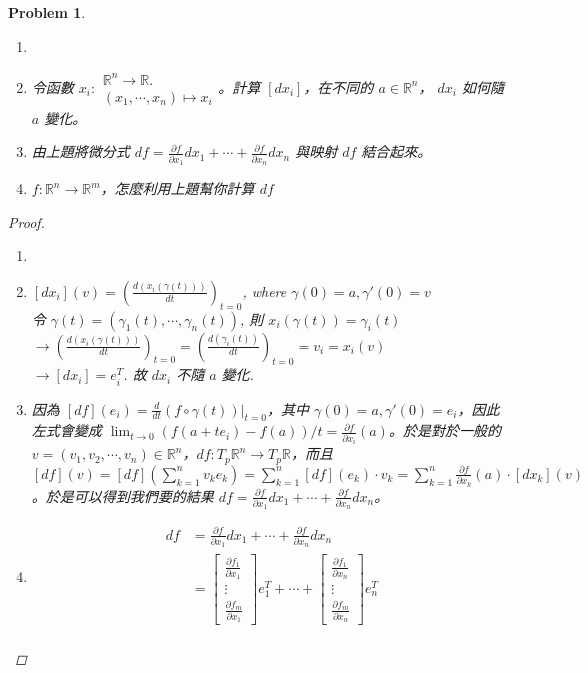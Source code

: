 \documentclass[10pt,a4paper]{article}
\newcounter{theProblemCounter}
\newtheorem{problem}[theProblemCounter]{Problem}
\begin{document}
\setcounter{theProblemCounter}{7}
\begin{problem}
\begin{enumerate}
\item[]
\item[(a)] 令函數 $x_i:\begin{array}{c}\mathbb{R}^n\to \mathbb{R}.\\ (x_1,\cdots, x_n)\mapsto x_i\end{array}$。計算 $[dx_i]$，在不同的 $a\in \mathbb{R}^n$， $dx_i$ 如何隨 $a$ 變化。
\item[(b)] 由上題將微分式 $df=\frac{\partial f}{\partial x_1} dx_1 + \cdots + \frac{\partial f}{\partial x_n} dx_n$ 與映射 $df$ 結合起來。
\item[(c)] $f:\mathbb{R}^n\to \mathbb{R}^m$，怎麼利用上題幫你計算 $df$
\end{enumerate}
\begin{proof}
\begin{enumerate}
\item[]
\item[(a)]
$[dx_i](v)=\left(\frac{d(x_i(\gamma(t)))}{dt}\right)_{t=0}$, where $\gamma(0)=a, \gamma'(0)=v$\\
令 $\gamma(t)=\left(\gamma_1(t),\cdots,\gamma_n(t)\right)$, 則 $x_i(\gamma(t))=\gamma_i(t)$\\
$\rightarrow \left(\frac{d(x_i(\gamma(t)))}{dt}\right)_{t=0}=\left(\frac{d(\gamma_i(t))}{dt}\right)_{t=0}=v_i=x_i(v)$\\
$\rightarrow [dx_i]=e_i^T$.
故 $dx_i$ 不隨 $a$ 變化.
\item[(b)]
因為 $[df](e_i) =\frac{d}{dt}(f\circ \gamma(t))\bigg|_{t=0}$，其中 $\gamma(0)=a, \gamma'(0)=e_i$，因此左式會變成 $\lim_{t\to 0} (f(a+te_i)-f(a))/t = \frac{\partial f}{\partial x_i}(a)$。於是對於一般的 $v=(v_1,v_2,\cdots, v_n)\in \mathbb{R}^n$，$df:T_p\mathbb{R}^n\to T_p\mathbb{R}$，而且 $[df](v) = [df](\sum_{k=1}^n v_ke_k) = \sum_{k=1}^n [df](e_k)\cdot v_k = \sum_{k=1}^n \frac{\partial f}{\partial x_k}(a)\cdot [dx_k](v)$。於是可以得到我們要的結果 $df=\frac{\partial f}{\partial x_1} dx_1 + \cdots + \frac{\partial f}{\partial x_n} dx_n$。
\item[(c)]
\begin{align*}
df&=\frac{\partial f}{\partial x_1} dx_1 + \cdots + \frac{\partial f}{\partial x_n} dx_n\\
&=\begin{bmatrix}\frac{\partial f_1}{\partial x_1}\\ \vdots \\ \frac{\partial f_m}{\partial x_1}\end{bmatrix}e_1^T + \cdots + \begin{bmatrix}\frac{\partial f_1}{\partial x_n}\\ \vdots \\ \frac{\partial f_m}{\partial x_n}\end{bmatrix}e_n^T\\

\end{align*}
\end{enumerate}
\end{proof}
\end{problem}
\end{document}

